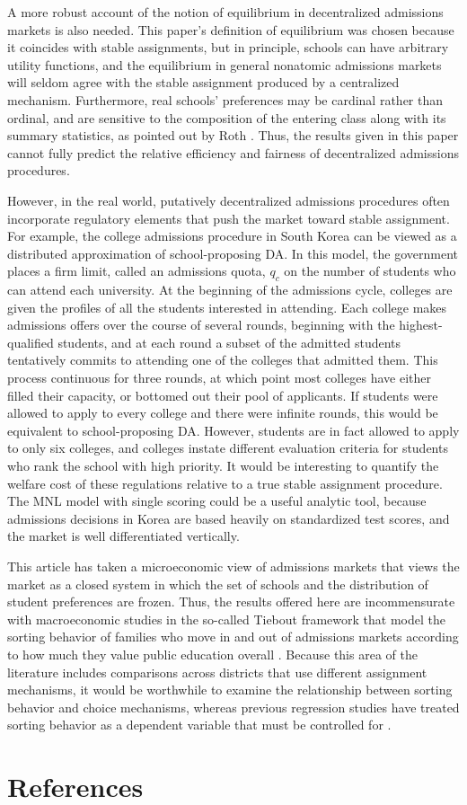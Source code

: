 \documentclass[12pt]{article}
\numberwithin{equation}{subsection}
\theoremstyle{definition}
\begin{document}
A more robust account of the notion of equilibrium in decentralized admissions markets is also needed. This paper's definition of equilibrium was chosen because it coincides with stable assignments, but in principle, schools can have arbitrary utility functions, and the equilibrium in general nonatomic admissions markets will seldom agree with the stable assignment produced by a centralized mechanism. Furthermore, real schools' preferences may be cardinal rather than ordinal, and are sensitive to the composition of the entering class along with its summary statistics, as pointed out by Roth \parencite*{collegeadmissionsisnotmarriage}. Thus, the results given in this paper cannot fully predict the relative efficiency and fairness of decentralized admissions procedures. 

However, in the real world, putatively decentralized admissions procedures often incorporate regulatory elements that push the market toward stable assignment. For example, the college admissions procedure in South Korea can be viewed as a distributed approximation of school-proposing DA. In this model, the government places a firm limit, called an admissions quota, $q_c$ on the number of students who can attend each university. At the beginning of the admissions cycle, colleges are given the profiles of all the students interested in attending. Each college makes admissions offers over the course of several rounds, beginning with the highest-qualified students, and at each round a subset of the admitted students tentatively commits to attending one of the colleges that admitted them. This process continuous for three rounds, at which point most colleges have either filled their capacity, or bottomed out their pool of applicants. If students were allowed to apply to every college and there were infinite rounds, this would be equivalent to school-proposing DA. However, students are in fact allowed to apply to only six colleges, and colleges instate different evaluation criteria for students who rank the school with high priority. It would be interesting to quantify the welfare cost of these regulations relative to a true stable assignment procedure. The MNL model with single scoring could be a useful analytic tool, because admissions decisions in Korea are based heavily on standardized test scores, and the market is well differentiated vertically.

This article has taken a microeconomic view of admissions markets that views the market as a closed system in which the set of schools and the distribution of student preferences are frozen. Thus, the results offered here are incommensurate with macroeconomic studies in the so-called Tiebout framework that model the sorting behavior of families who move in and out of admissions markets according to how much they value public education overall \parencite[][]{apuretheoryoflocalexpenditures, equilibriumandlocalredistribution}. Because this area of the literature includes comparisons across districts that use different assignment mechanisms, it would be worthwhile to examine the relationship between sorting behavior and choice mechanisms, whereas previous regression studies have treated sorting behavior as a dependent variable that must be controlled for \parencite[][]{doescompetitionamongpublicschools}.

\pagebreak
\section{References}
\printbibliography[heading=none]
\end{document}
